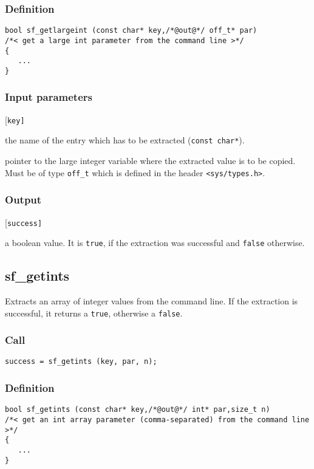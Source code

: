 \subsubsection*{Definition}
\begin{verbatim}
bool sf_getlargeint (const char* key,/*@out@*/ off_t* par) 
/*< get a large int parameter from the command line >*/
{
   ...
}
\end{verbatim}

\subsubsection*{Input parameters}
\begin{desclist}{\tt }{\quad}[\tt key]
   \setlength\itemsep{0pt}
   \item[key] the name of the entry which has to be extracted (\texttt{const char*}).
   \item[par] pointer to the large integer variable where the extracted value is to be copied. Must be of type \texttt{off\_t} which is defined in the header \texttt{<sys/types.h>}.
\end{desclist}

\subsubsection*{Output}
\begin{desclist}{\tt }{\quad}[\tt success]
   \setlength\itemsep{0pt}
   \item[success]  a boolean value. It is \texttt{true}, if the extraction was successful and \texttt{false} otherwise.
\end{desclist}




\subsection{{sf\_getints}}
Extracts an array of integer values from the command line. If the extraction is successful, it returns a \texttt{true}, otherwise a \texttt{false}. 

\subsubsection*{Call}
\begin{verbatim}success = sf_getints (key, par, n);\end{verbatim}

\subsubsection*{Definition}
\begin{verbatim}
bool sf_getints (const char* key,/*@out@*/ int* par,size_t n) 
/*< get an int array parameter (comma-separated) from the command line >*/
{
   ...
} 
\end{verbatim}

